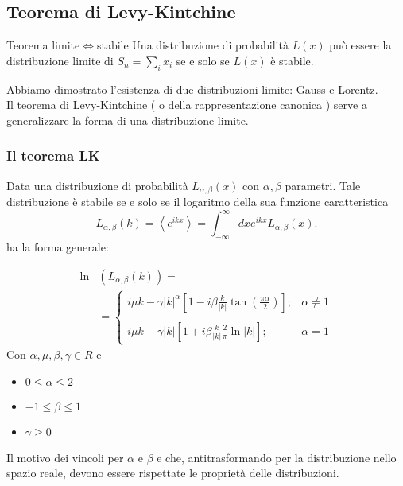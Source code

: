 \subsection{Teorema di Levy-Kintchine}%
\label{sub:Distribuzioni limite}
\begin{bluebox}{Teorema limite$\iff$stabile}
    Una distribuzione di probabilità $L(x)$ può essere la distribuzione limite di $S_n = \sum_{i}^{} x_i$ se e solo se $L(x)$ è stabile.
\end{bluebox}
\noindent
Abbiamo dimostrato l'esistenza di due distribuzioni limite: Gauss e Lorentz.\\
Il teorema di Levy-Kintchine ( o della rappresentazione canonica ) serve a generalizzare la forma di una distribuzione limite.
\subsubsection{Il teorema LK}%
\label{subsub:Il teorema LK}
Data una distribuzione di probabilità $L_{\alpha,\beta}(x)$ con $\alpha,\beta$ parametri. Tale distribuzione è stabile se e solo se il logaritmo della sua funzione caratteristica
\[
    L_{\alpha,\beta  }(k) = \left<e^{ikx}\right> = \int_{-\infty}^{\infty} dx e^{ikx}L_{\alpha,\beta  }(x)  
.\] 
ha la forma generale:
\begin{redbox}{}
\[\begin{aligned}
    \ln&(L_{\alpha,\beta}(k)) =\\
       &=\begin{cases}
	   i\mu k-\gamma \left|k\right|^\alpha\left[1-i\beta  \frac{k}{\left|k\right|}\tan\left(\frac{\pi\alpha}{2}\right)\right]; & \alpha\neq 1\\
																   &\\
	   i\mu k-\gamma \left|k\right|\left[1+i\beta  \frac{k}{\left|k\right|} \frac{2}{\pi}\ln\left|k\right|\right]; &\alpha = 1
       \end{cases}
\end{aligned}\]    
Con $\alpha, \mu, \beta,\gamma  \in R$ e
\begin{itemize}
    \item $0\le \alpha\le 2$
    \item $-1\le \beta\le 1$ 
    \item $\gamma\ge 0$ 
\end{itemize}
\end{redbox}
\noindent
Il motivo dei vincoli per $\alpha$ e $\beta$ e che, antitrasformando per la distribuzione nello spazio reale, devono essere rispettate le proprietà delle distribuzioni.
